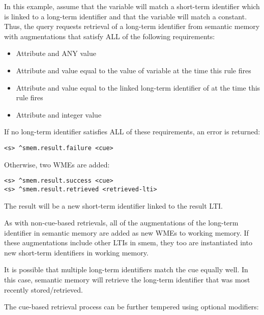 In this example, assume that the  variable will match a short-term identifier which is linked to a long-term identifier and that the  variable will match a constant.  
Thus, the query requests retrieval of a long-term identifier from semantic memory with augmentations that satisfy ALL of the following requirements:

\begin{itemize}

\item 
Attribute  and ANY value

\item 
Attribute  and value equal to the value of variable  at the time this rule fires

\item 
Attribute  and value equal to the linked long-term identifier of  at the time this rule fires

\item 
Attribute  and integer value 

\end{itemize}

If no long-term identifier satisfies ALL of these requirements, an error is returned:

\begin{verbatim}
<s> ^smem.result.failure <cue>
\end{verbatim}

Otherwise, two WMEs are added:

\begin{verbatim}
<s> ^smem.result.success <cue>
<s> ^smem.result.retrieved <retrieved-lti>
\end{verbatim}

The result  will be a new short-term identifier linked to the result LTI. 

As with non-cue-based retrievals, all of the augmentations of the long-term identifier in semantic memory are added as new WMEs to working memory. If these augmentations include other LTIs in smem, they too are instantiated into new short-term identifiers in working memory.

It is possible that multiple long-term identifiers match the cue equally well. 
In this case, semantic memory will retrieve the long-term identifier that was most recently stored/retrieved.

The cue-based retrieval process can be further tempered using optional modifiers:

